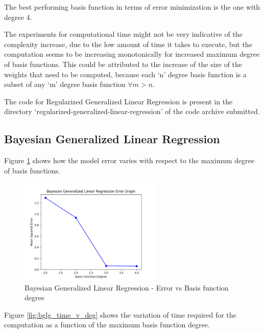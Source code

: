 \documentclass[parskip=full]{scrartcl}
\begin{document}
            The best performing basis function in terms of error minimization is the one with degree 4.

            The experiments for computational time might not be very indicative of the complexity increase, due to the low amount of time it takes to execute, but the computation seems to be increasing monotonically for increased maximum degree of basis functions. This could be attributed to the increase of the size of the weights that need to be computed, because each `n' degree basis function is a subset of any `m' degree basis function $\forall m > n$.
        

        The code for Regularized Generalized Linear Regression is present in the directory `regularized-generalized-linear-regression' of the code archive submitted.


    \subsection{Bayesian Generalized Linear Regression} %
    \label{sub:bayesian_generalized_linear_regression}
    
        Figure \ref{fig:bglg_err_v_deg} shows how the model error varies with respect to the maximum degree of basis functions.

        \begin{figure}[ht]
            \centering
            \includegraphics[width=0.6\textwidth]{3b_degree_vs_error.png}
            \caption{Bayesian Generalized Linear Regression - Error vs Basis function degree}
            \label{fig:bglg_err_v_deg}
        \end{figure}

        Figure \ref{fig:bglg_time_v_deg} shows the variation of time required for the computation as a function of the maximum basis function degree.
\end{document}
